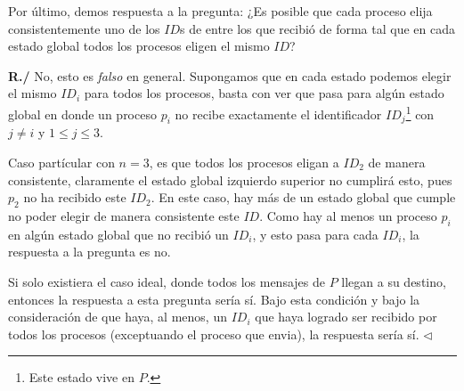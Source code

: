 Por último, demos respuesta a la pregunta: ¿Es posible que cada
proceso elija consistentemente uno de los $ID$s de entre los que
recibió de forma tal que en cada estado global todos los procesos
eligen el mismo $ID$?

\textbf{R./} No, esto es \textit{falso} en general. Supongamos que en cada
estado podemos elegir el mismo $ID_i$ para todos los procesos, basta con
ver que pasa para algún estado global en donde un proceso $p_i$ no recibe
exactamente el identificador $ID_j$\footnote{Este estado vive en $P$.}
con $j \not= i$ y $1 \leq j \leq 3$.

Caso partícular con $n = 3$, es que todos los procesos eligan a $ID_2$
de manera consistente, claramente el estado global izquierdo superior no
cumplirá esto, pues $p_2$ no ha recibido este $ID_2$. En este caso, hay
más de un estado global que cumple no poder elegir de manera consistente
este $ID$. Como hay al menos un proceso $p_i$ en algún estado global
que no recibió un $ID_i$, y esto pasa para cada $ID_i$, la respuesta
a la pregunta es no.

Si solo existiera el caso ideal, donde todos los mensajes de $P$ llegan
a su destino, entonces la respuesta a esta pregunta sería sí. Bajo esta
condición y bajo la consideración de que haya, al menos, un $ID_i$ que
haya logrado ser recibido por todos los procesos (exceptuando el proceso
que envia), la respuesta sería sí.
\hfill $\lhd$
